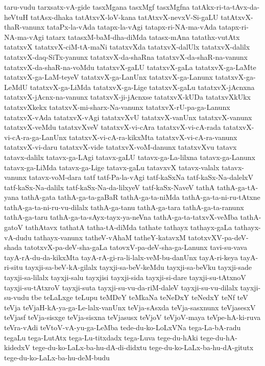 {taru-vudu
tarxsatx-vA-gide
tasxMgana
tasxMgf
tasxMgfna
tatAkx-ri-ta-tAvx-da-heVtuH
tatAsx-dhaka
tatAtxvX-loV-kana
tatAtxvX-nevxV-Si-gaLU
tatAtxvX-thaR-vanunx
tataPx-la-vAda
tatapx-la-vAgi
tatapx-ri-NA-ma-vAda
tatapx-ri-NA-ma-vAgi
tatarx
tatasxM-baM-dha-diMda
tatasx-mAna
tatathx-vutAtx
tatatxvX
tatatxvX-ciM-tA-maNi
tatatxvXda
tatatxvX-dalUlx
tatatxvX-dalilx
tatatxvX-daq-SiTx-yanunx
tatatxvX-da-shaRna
tatatxvX-da-shaR-na-vanunx
tatatxvX-da-shaR-na-voMdu
tatatxvX-gaLU
tatatxvX-gaLa
tatatxvX-ga-LaMte
tatatxvX-ga-LaM-teyeV
tatatxvX-ga-LanUnx
tatatxvX-ga-Lanunx
tatatxvX-ga-LeMdU
tatatxvX-ga-LiMda
tatatxvX-ga-Lige
tatatxvX-gaLu
tatatxvX-jAcnxna
tatatxvX-jAcnx-na-vanunx
tatatxvX-ji-jAcnxse
tatatxvX-kUDa
tatatxvXkUkx
tatatxvXkekx
tatatxvX-mi-sharx-Na-vanunx
tatatxvX-rU-pa-ga-Lanunx
tatatxvX-vAda
tatatxvX-vAgi
tatatxvXvU
tatatxvX-vanUnx
tatatxvX-vanunx
tatatxvX-veMdu
tatatxvXveV
tatatxvX-vi-cAra
tatatxvX-vi-cA-rada
tatatxvX-vi-cA-ra-ga-LanUnx
tatatxvX-vi-cA-ra-kikxMta
tatatxvX-vi-cA-ra-vanunx
tatatxvX-vi-daru
tatatxvX-vide
tatatxvX-voM-danunx
tatatxvXvu
tatavx
tatavx-dalilx
tatavx-ga-LAgi
tatavx-gaLU
tatavx-ga-La-lilxna
tatavx-ga-Lanunx
tatavx-ga-LiMda
tatavx-ga-Lige
tatavx-gaLu
tatavxvX
tatavx-valalx
tatavx-vanunx
tatavx-voM-dara
tatf
tatf-Pa-la-vAgi
tatf-kaSxNa
tatf-kaSx-Na-dalelxV
tatf-kaSx-Na-dalilx
tatf-kaSx-Na-da-lilxyeV
tatf-kaSx-NaveV
tathA
tathA-ga-tA-yana
tathA-gata
tathA-ga-ta-gaBaR
tathA-ga-ta-niMda
tathA-ga-ta-ni-ru-tAtxne
tathA-ga-ta-ni-ru-vu-dilalx
tathA-ga-tanu
tathA-ga-tara
tathA-ga-ta-ranunx
tathA-ga-taru
tathA-ga-ta-sAyx-tayx-ya-neVna
tathA-ga-ta-tatxvX-veMba
tathA-gatoV
tathAtavx
tathatA
tatha-tA-diMda
tathate
tathayx
tathayx-gaLa
tathayx-vA-dudu
tathayx-vanunx
tatheV-vAhaM
tatheY-katavxM
tatotxvXV-pa-deV-shada
tatotxvX-pa-deV-sha-gaLa
tatovxV-pa-deV-sha-ga-Lanunx
tavi-su-vava
tayA-rA-du-da-kikxMta
tayA-rA-gi-ra-li-lalx-veM-bu-danUnx
tayA-ri-keya
tayA-ri-situ
tayxji-sa-beV-kA-gilalx
tayxji-sa-beV-keMdu
tayxji-sa-beVku
tayxji-sade
tayxji-sa-lilalx
tayxji-salu
tayxjisi
tayxji-sida
tayxji-si-dare
tayxji-su-tAtxnoV
tayxji-su-tAtxroV
tayxji-suta
tayxji-su-vu-da-riM-daleV
tayxji-su-vu-dilalx
tayxji-su-vudu
tbe
teLaLxge
teLupu
teMDeY
teMkaNa
teNeDxY
teNedxY
teNf
teV
teVja
teVjaH-kA-ya-ga-Le-lalx-vanUnx
teVja-sAsxda
teVja-sasxnunx
teVjasesxV
teVjasf
teVja-sisxge
teVja-sisxna
teVjasusx
teVjoV
teVjoV-maya
teVpe-hA-ki-ruva
teVra-vAdi
teVtoV-vA-yu-ga-LeMba
tede-du-ko-LoLxVNa
tega-La-bA-radu
tegaLu
tega-LutAtx
tega-Lu-titxdadx
tega-Luva
tege-du-hAki
tege-du-hA-kidedxV
tege-du-ko-LaLx-ba-hu-dA-di-didxtu
tege-du-ko-LaLx-ba-hu-dA-gitutx
tege-du-ko-LaLx-ba-hu-deM-budu
}
